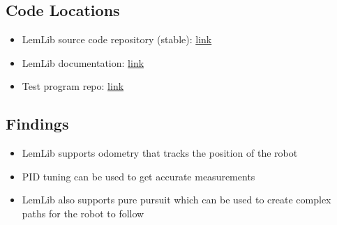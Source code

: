 \subsection*{Code Locations}
\begin{itemize}
    \item LemLib source code repository (stable): \href{https://github.com/LemLib/LemLib/tree/stable/}{link}
    \item LemLib documentation: \href{https://lemlib.readthedocs.io/en/stable/}{link}
    \item Test program repo: \href{https://github.com/msoe-vex/CasADi-Test.git}{link}
\end{itemize}

\subsection*{Findings}
\begin{itemize}
    \item LemLib supports odometry that tracks the position of the robot
    \item PID tuning can be used to get accurate measurements
    \item LemLib also supports pure pursuit which can be used to create complex paths for the robot to follow
\end{itemize}

